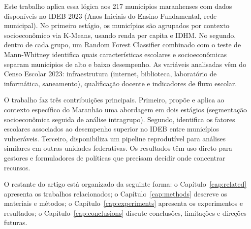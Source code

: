 Este trabalho aplica essa lógica aos 217 municípios maranhenses com dados disponíveis no IDEB 2023 (Anos Iniciais do Ensino Fundamental, rede municipal). No primeiro estágio, os municípios são agrupados por contexto socioeconômico via K-Means, usando renda per capita e IDHM. No segundo, dentro de cada grupo, um Random Forest Classifier combinado com o teste de Mann-Whitney identifica quais características escolares e socioeconômicas separam municípios de alto e baixo desempenho. As variáveis analisadas vêm do Censo Escolar 2023: infraestrutura (internet, biblioteca, laboratório de informática, saneamento), qualificação docente e indicadores de fluxo escolar.

O trabalho faz três contribuições principais. Primeiro, propõe e aplica ao contexto específico do Maranhão uma abordagem em dois estágios (segmentação socioeconômica seguida de análise intragrupo). Segundo, identifica os fatores escolares associados ao desempenho superior no IDEB entre municípios vulneráveis. Terceiro, disponibiliza um pipeline reprodutível para análises similares em outras unidades federativas. Os resultados têm uso direto para gestores e formuladores de políticas que precisam decidir onde concentrar recursos.

O restante do artigo está organizado da seguinte forma: o Capítulo~\ref{cap:related} apresenta os trabalhos relacionados; o Capítulo~\ref{cap:methods} descreve os materiais e métodos; o Capítulo~\ref{cap:experiments} apresenta os experimentos e resultados; o Capítulo~\ref{cap:conclusions} discute conclusões, limitações e direções futuras.